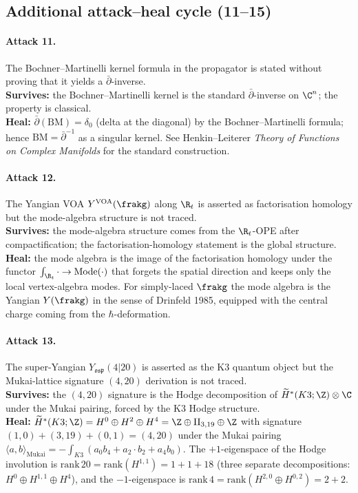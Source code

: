 \subsection*{Additional attack--heal cycle (11--15)}

\paragraph{Attack 11.}
The Bochner--Martinelli kernel formula in the propagator is stated
without proving that it yields a $\bar\partial$-inverse. \\
\textbf{Survives:} the Bochner--Martinelli kernel is the standard
$\bar\partial$-inverse on $\C^n$; the property is classical. \\
\textbf{Heal:} $\bar\partial(\mathrm{BM}) = \delta_0$ (delta at the
diagonal) by the Bochner--Martinelli formula; hence $\mathrm{BM}
= \bar\partial^{-1}$ as a singular kernel. See Henkin--Leiterer
\emph{Theory of Functions on Complex Manifolds} for the standard
construction.

\paragraph{Attack 12.}
The Yangian VOA $Y^{\mathrm{VOA}}(\frakg)$ along $\R_t$ is asserted as
factorisation homology but the mode-algebra structure is not traced. \\
\textbf{Survives:} the mode-algebra structure comes from the
$\R_t$-OPE after compactification; the factorisation-homology
statement is the global structure. \\
\textbf{Heal:} the mode algebra is the image of the factorisation
homology under the functor $\int_{\R_t}\cdot\to\mathrm{Mode}(\cdot)$
that forgets the spatial direction and keeps only the local
vertex-algebra modes. For simply-laced $\frakg$ the mode algebra is
the Yangian $Y(\frakg)$ in the sense of Drinfeld 1985, equipped with
the central charge coming from the $\hbar$-deformation.

\paragraph{Attack 13.}
The super-Yangian $Y_{\mathfrak{osp}}(4|20)$ is asserted as the K3
quantum object but the Mukai-lattice signature $(4, 20)$ derivation
is not traced. \\
\textbf{Survives:} the $(4, 20)$ signature is the Hodge decomposition
of $\widetilde H^*(K3;\Z)\otimes\C$ under the Mukai pairing, forced
by the K3 Hodge structure. \\
\textbf{Heal:} $\widetilde H^*(K3;\Z) = H^0\oplus H^2\oplus H^4
= \Z\oplus \mathrm{II}_{3, 19}\oplus \Z$ with signature
$(1, 0) + (3, 19) + (0, 1) = (4, 20)$ under the Mukai pairing
$\langle a, b\rangle_{\mathrm{Mukai}} =
-\int_{K3}(a_0 b_4 + a_2 \cdot b_2 + a_4 b_0)$. The
$+1$-eigenspace of the Hodge involution is
$\mathrm{rank}\, 20 = \mathrm{rank}(H^{1, 1})
= 1 + 1 + 18$ (three separate decompositions: $H^0\oplus H^{1,1}\oplus H^4$),
and the $-1$-eigenspace is $\mathrm{rank}\, 4 = \mathrm{rank}(H^{2, 0}\oplus H^{0, 2}) = 2 + 2$.

